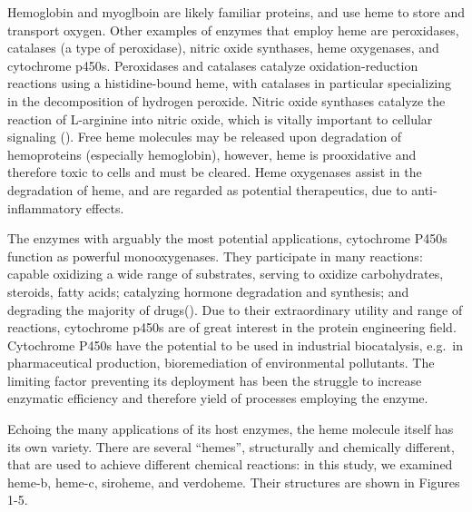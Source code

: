 \documentclass[a4paper, nobind]{templates/ociamthesis}
\begin{document}
Hemoglobin and myoglboin are likely familiar proteins, and use heme to store and transport oxygen. Other examples of enzymes that employ heme are peroxidases, catalases (a type of peroxidase), nitric oxide synthases, heme oxygenases, and cytochrome p450s. Peroxidases and catalases catalyze oxidation-reduction reactions using a histidine-bound heme, with catalases in particular specializing in the decomposition of hydrogen peroxide. Nitric oxide synthases catalyze the reaction of L-arginine into nitric oxide, which is vitally important to cellular signaling (\textcite{Poulos2014}). Free heme molecules may be released upon degradation of hemoproteins (especially hemoglobin), however, heme is prooxidative and therefore toxic to cells and must be cleared. Heme oxygenases assist in the degradation of heme, and are regarded as potential therapeutics, due to anti-inflammatory effects\autocite{Araujo2012}.

The enzymes with arguably the most potential applications, cytochrome P450s function as powerful monooxygenases. They participate in many reactions: capable oxidizing a wide range of substrates, serving to oxidize carbohydrates, steroids, fatty acids; catalyzing hormone degradation and synthesis; and degrading the majority of drugs(\textcite{Poulos2014}). Due to their extraordinary utility and range of reactions, cytochrome p450s are of great interest in the protein engineering field. Cytochrome P450s have the potential to be used in industrial biocatalysis, e.g.~in pharmaceutical production, bioremediation of environmental pollutants\autocite{Du2017,Lalonde2016}. The limiting factor preventing its deployment has been the struggle to increase enzymatic efficiency and therefore yield of processes employing the enzyme\autocite{Girvan2016,Li2020}.

Echoing the many applications of its host enzymes, the heme molecule itself has its own variety. There are several ``hemes'', structurally and chemically different, that are used to achieve different chemical reactions: in this study, we examined heme-b, heme-c, siroheme, and verdoheme. Their structures are shown in Figures 1-5.
\end{document}
